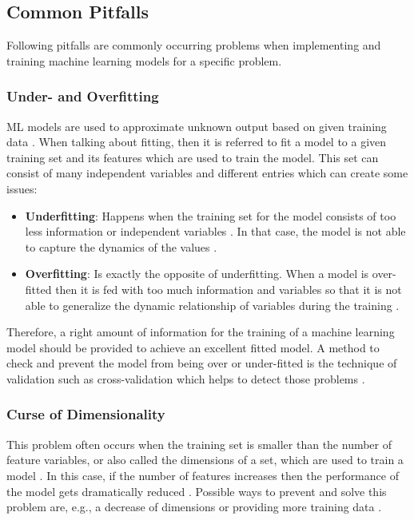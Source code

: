 \documentclass[MGS,Master,english]{twbook}%
\begin{document}
\subsection{Common Pitfalls}
Following pitfalls are commonly occurring problems when implementing and training machine learning models for a specific problem.

\subsubsection{Under- and Overfitting}
ML models are used to approximate unknown output based on given training data \cite{ml::book::algorithms}. When talking about fitting, then it is referred to fit a model to a given training set and its features which are used to train the model. This set can consist of many independent variables and different entries which can create some issues:
\begin{itemize}
	\item \textbf{Underfitting}: Happens when the training set for the model consists of too less information or independent variables \cite{ml::book::algorithms}. In that case, the model is not able to capture the dynamics of the values \cite{ml::book::algorithms}.
	\item \textbf{Overfitting}: Is exactly the opposite of underfitting. When a model is over-fitted then it is fed with too much information and variables so that it is not able to generalize the dynamic relationship of variables during the training \cite{ml::book::algorithms}.
\end{itemize}
Therefore, a right amount of information for the training of a machine learning model should be provided to achieve an excellent fitted model. A method to check and prevent the model from being over or under-fitted is the technique of validation such as cross-validation which helps to detect those problems \cite{ml::book::algorithms}.

\subsubsection{Curse of Dimensionality}
This problem often occurs when the training set is smaller than the number of feature variables, or also called the dimensions of a set, which are used to train a model \cite{ml::book::algorithms}. In this case, if the number of features increases then the performance of the model gets dramatically reduced \cite{ml::book::algorithms}. Possible ways to prevent and solve this problem are, e.g., a decrease of dimensions or providing more training data \cite{ml::book::algorithms}.
\end{document}
